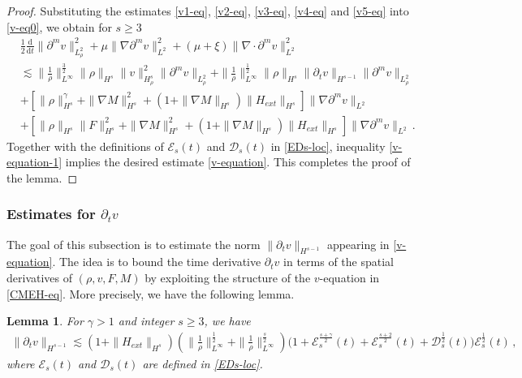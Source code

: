 \documentclass[reqno,11pt]{amsart}
\newtheorem{lemma}{Lemma}[section]
\numberwithin{equation}{section}
\def\d{\mathrm{d}}
\begin{document}
\begin{proof}
Substituting the estimates \eqref{v1-eq}, \eqref{v2-eq}, \eqref{v3-eq}, \eqref{v4-eq} and \eqref{v5-eq} into \eqref{v-eq0}, we obtain for $s \geq 3$
\begin{equation}\label{v-equation-1}
	\begin{aligned}
&\frac{1}{2} \frac{\d}{\d t} \|\partial^m v\|_{L^2_\rho}^2 + \mu \|\nabla \partial^m v\|_{L^2}^2 + (\mu + \xi) \|\nabla \cdot \partial^m v\|_{L^2}^2 \\&
\lesssim \| \frac{1}{\rho} \|_{L^\infty}^{\frac{3}{2}} \|\rho\|_{H^s} \|v\|_{H^s_\rho}^2 \|\partial^m v\|_{L^2_\rho} + \| \frac{1}{\rho} \|_{L^\infty}^{\frac{1}{2}} \|\rho\|_{H^s} \|\partial_t v\|_{H^{s - 1}} \|\partial^m v\|_{L^2_\rho} \\&
+[ \|\rho\|_{H^s}^\gamma + \|\nabla M\|_{H^s}^2 + (1 + \|\nabla M\|_{H^s}) \|H_{ext}\|_{H^s} ] \|\nabla \partial^m v\|_{L^2}\\&
+ \left[ \|\rho\|_{H^s} \|F\|_{H^s}^2 + \|\nabla M\|_{H^s}^2 + (1 + \|\nabla M\|_{H^s}) \|H_{ext}\|_{H^s} \right] \|\nabla \partial^m v\|_{L^2}\,.
	\end{aligned}
\end{equation}
Together with the definitions of $\mathcal{E}_s(t)$ and $\mathcal{D}_s(t)$ in \eqref{EDs-loc}, inequality \eqref{v-equation-1} implies the desired estimate \eqref{v-equation}. This completes the proof of the lemma.
\end{proof}

\subsubsection{\bf Estimates for $\partial_t v$}

The goal of this subsection is to estimate the norm $\|\partial_t v\|_{H^{s-1}}$ appearing in \eqref{v-equation}. The idea is to bound the time derivative $\partial_t v$ in terms of the spatial derivatives of $(\rho, v, F, M)$ by exploiting the structure of the $v$-equation in \eqref{CMEH-eq}. More precisely, we have the following lemma.

\begin{lemma}\label{Lmm-dtv-loc}
    For $\gamma > 1$ and integer $s \geq 3$, we have
    \begin{equation}\label{dtv-equation}
	\begin{aligned}
\|\partial_t v\|_{H^{s-1}} \lesssim (1 + \| H_{ext} \|_{H^s}) ( \|\frac{1}{\rho}\|^\frac{1}{2}_{L^\infty} + \|\frac{1}{\rho}\|^\frac{s}{2}_{L^\infty} ) \big(1 + \mathcal{E}_s^\frac{s + \gamma}{ 2 } (t) + \mathcal{E}_s^\frac{s + 2}{ 2 } (t) + \mathcal{D}_s^\frac{1}{2} (t) \big) \mathcal{E}_s^\frac{1}{2} (t)  \,,
	\end{aligned}
\end{equation}
where $\mathcal{E}_s (t)$ and $\mathcal{D}_s (t)$ are defined in \eqref{EDs-loc}.
\end{lemma}
\end{document}
